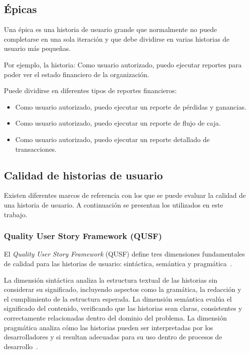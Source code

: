 \subsection{Épicas}
\label{sec:epicas}
Una épica es una historia de usuario grande que normalmente no puede completarse en una sola iteración y que debe dividirse en varias historias de usuario más pequeñas.~\cite{cohan_epic}

Por ejemplo, la historia: Como usuario autorizado, puedo ejecutar reportes para poder ver el estado financiero de la organización.

Puede dividirse en diferentes tipos de reportes financieros:
\begin{itemize}
  \item Como usuario autorizado, puedo ejecutar un reporte de pérdidas y ganancias.
  \item Como usuario autorizado, puedo ejecutar un reporte de flujo de caja.
  \item Como usuario autorizado, puedo ejecutar un reporte detallado de transacciones.
\end{itemize}

\subsection{Calidad de historias de usuario}
\label{sec:calidad_historias}

Existen diferentes marcos de referencia con los que se puede evaluar la calidad de una historia de usuario. A continuación se presentan los utilizados en este trabajo.

\subsubsection{Quality User Story Framework (QUSF)}
\label{sec:qusf}

El \textit{Quality User Story Framework} (QUSF) define tres dimensiones fundamentales de calidad para las historias de usuario: sintáctica, semántica y pragmática~\cite{aqusa-paper}.

La dimensión sintáctica analiza la estructura textual de las historias sin considerar su significado, incluyendo aspectos como la gramática, la redacción y el cumplimiento de la estructura esperada. La dimensión semántica evalúa el significado del contenido, verificando que las historias sean claras, consistentes y correctamente relacionadas dentro del dominio del problema. La dimensión pragmática analiza cómo las historias pueden ser interpretadas por los desarrolladores y si resultan adecuadas para su uso dentro de procesos de desarrollo~\cite{aqusa-paper}.

